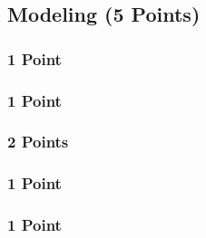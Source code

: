 \newif\ifvimbug
\vimbugfalse

\ifvimbug

\fi


\subsection{Modeling (5 Points)}
\subsubsection{1 Point}

\subsubsection{1 Point}

\subsubsection{2 Points}

\subsubsection{1 Point}

\subsubsection{1 Point}
